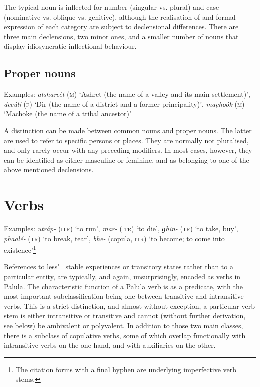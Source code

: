 The typical noun is inflected for number (singular vs. plural) and case (nominative vs. oblique vs. genitive), although the realisation of and formal expression of each category are subject to declensional differences. There are three main declensions, two minor ones, and a smaller number of nouns that display idiosyncratic inflectional behaviour.


\subsection{Proper nouns}
\label{subsec:3b-2-1}
Examples: \textit{atshareét} (\textsc{m}) `Ashret (the name of a valley and its main settlement)', \textit{deeúli} (\textsc{f}) `Dir (the name of a district and a former principality)', \textit{mac̣hoók} (\textsc{m}) `Machoke (the name of a tribal ancestor)'


A distinction can be made between common nouns and proper nouns. The latter are used to refer to specific persons or places. They are normally not pluralised, and only rarely occur with any preceding modifiers. In most cases, however, they can be identified as either masculine or feminine, and as belonging to one of the above mentioned declensions.

\section{Verbs}
\label{sec:3b-3}

Examples: \textit{utráp-} (\textsc{itr}) `to run', \textit{mar-} (\textsc{itr}) `to die', \textit{ɡhin-} (\textsc{tr}) `to take, buy', \textit{phaalé-} (\textsc{tr}) `to break, tear', \textit{bhe-} (copula, \textsc{itr}) `to become; to come into existence'\footnote{The citation forms with a final hyphen are underlying imperfective verb stems.}


References to less"=stable experiences or transitory states rather than to a particular entity, are typically, and again, unsurprisingly, encoded as verbs in Palula. The characteristic function of a Palula verb is as a predicate, with the most important subclassification being one between transitive and intransitive verbs. This is a strict distinction, and almost without exception, a particular verb stem is either intransitive or transitive and cannot (without further derivation, see below) be ambivalent or polyvalent. In addition to those two main classes, there is a subclass of copulative verbs, some of which overlap functionally with intransitive verbs on the one hand, and with auxiliaries on the other.


